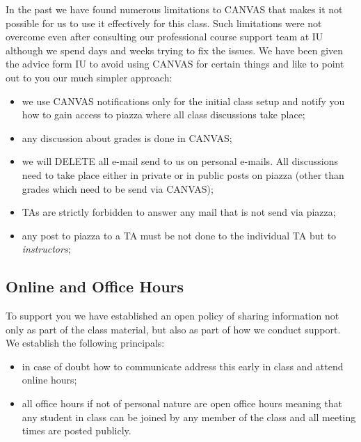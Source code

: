 \begin{itemize}
In the past we have found numerous limitations to CANVAS that makes it
not possible for us to use it effectively for this class. Such
limitations were not overcome even after consulting our professional
course support team at IU although we spend days and weeks trying to
fix the issues. We have been given the advice form IU to avoid using
CANVAS for certain things and like to point out to you our much
simpler approach:

\begin{itemize}

\item we use CANVAS notifications only for the initial class setup and
  notify you how to gain access to piazza where all class discussions
  take place;

\item any discussion about grades is done in CANVAS;

\item we will DELETE all e-mail send to us on personal e-mails. All
  discussions need to take place either in private or in public posts
  on piazza (other than grades which need to be send via CANVAS);

\item TAs are strictly forbidden to answer any mail that is not send
  via piazza;

\item any post to piazza to a TA must be not done to the individual TA
  but to {\em instructors};

\end{itemize}

\subsection{Online  and Office Hours}

To support you we have established an open policy of sharing
information not only as part of the class material, but also as part
of how we conduct support. We establish the following principals:

\begin{itemize}

\item in case of doubt how to communicate address this early in class
  and attend online hours;

\item all office hours if not of personal nature are open office hours
  meaning that any student in class can be joined by any member of the
  class and  all meeting times are posted publicly.


\end{itemize}
\end{itemize}
